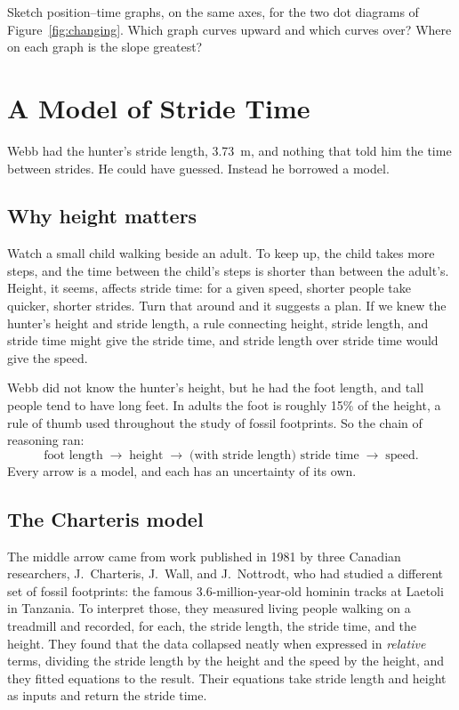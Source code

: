 \documentclass[11pt,twoside,openany]{book}
\newcounter{check}[chapter]
\begin{document}
\begin{checkbox}
Sketch position--time graphs, on the same axes, for the two dot diagrams of Figure~\ref{fig:changing}. Which graph curves upward and which curves over? Where on each graph is the slope greatest?
\end{checkbox}

\section{A Model of Stride Time}
\label{sec:stridemodel}

Webb had the hunter's stride length, \SI{3.73}{\metre}, and nothing that told him the time between strides. He could have guessed. Instead he borrowed a model.

\subsection{Why height matters}

Watch a small child walking beside an adult. To keep up, the child takes more steps, and the time between the child's steps is shorter than between the adult's. Height, it seems, affects stride time: for a given speed, shorter people take quicker, shorter strides. Turn that around and it suggests a plan. If we knew the hunter's height and stride length, a rule connecting height, stride length, and stride time might give the stride time, and stride length over stride time would give the speed.

Webb did not know the hunter's height, but he had the foot length, and tall people tend to have long feet. In adults the foot is roughly \num{15}\% of the height, a rule of thumb used throughout the study of fossil footprints. So the chain of reasoning ran:
\[
\text{foot length} \;\longrightarrow\; \text{height} \;\longrightarrow\; \text{(with stride length) stride time} \;\longrightarrow\; \text{speed}.
\]
Every arrow is a model, and each has an uncertainty of its own.

\subsection{The Charteris model}

The middle arrow came from work published in 1981 by three Canadian researchers, J.~Charteris, J.~Wall, and J.~Nottrodt, who had studied a different set of fossil footprints: the famous \num{3.6}-million-year-old hominin tracks at Laetoli in Tanzania. To interpret those, they measured living people walking on a treadmill and recorded, for each, the stride length, the stride time, and the height. They found that the data collapsed neatly when expressed in \emph{relative} terms, dividing the stride length by the height and the speed by the height, and they fitted equations to the result. Their equations take stride length and height as inputs and return the stride time.
\end{document}
